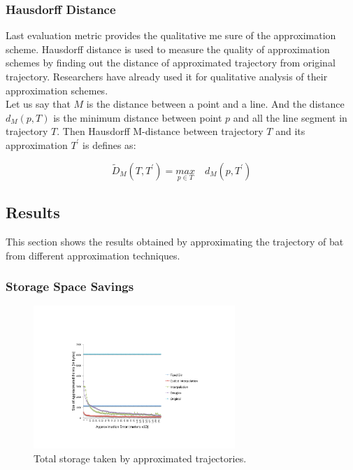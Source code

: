 \documentclass[conference]{IEEEtran}
\begin{document}
 \subsubsection{Hausdorff Distance}
 Last evaluation metric provides the qualitative me sure of the approximation scheme. Hausdorff distance is used to measure 
 the quality of approximation schemes by finding out the distance of approximated trajectory from original trajectory. Researchers 
 have already used it for qualitative analysis of their approximation schemes\cite{Cao:2006:SDR:1147679.1147681}.\\
Let us say that $M$ is the distance between a point and a line. And the distance $d_M(p,T)$ is the minimum distance between 
point $p$ and all the line segment in trajectory $T$. Then Hausdorff M-distance between trajectory $T$ and its approximation 
$T^\prime$ is defines as:

\[ { { \tilde { D }  }_{ M }(T,T^\prime ) }={ \underset { p\in T }{ max }  }\quad { d }_{ M }(p,T^\prime )\]
 \subsection{Results}
This section shows the results obtained by approximating the trajectory of bat from different approximation techniques.

\subsubsection{Storage Space Savings}

\begin{figure}[h]
  \centering
  \includegraphics[width=3in]{images/total-storage-size.pdf}
  \caption {Total storage taken by approximated trajectories.}
  \label{fig:storage-size}
\end{figure}
\end{document}
